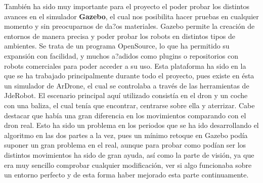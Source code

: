 \hspace{1 cm} Tambi\'en ha sido muy importante para el proyecto el poder probar los distintos avances en el simulador \textbf{Gazebo}, el cual nos posibilita hacer pruebas en cualquier momento y sin preocuparnos de da?os materiales. Gazebo permite la creaci\'on de entornos de manera precisa y poder probar los robots en distintos tipos de ambientes. Se trata de un programa OpenSource, lo que ha permitido su expansi\'on con facilidad, y muchos a?adidos como plugins o repositorios con robots comerciales para poder acceder a su uso. Esta plataforma ha sido en la que se ha trabajado principalmente durante todo el proyecto, pues existe en \'esta un simulador de ArDrone, el cual se controlaba a trav\'es de las herramientas de JdeRobot. El escenario principal aqu\'i utilizado consist\'ia en el dron y un coche con una baliza, el cual ten\'ia que encontrar, centrarse sobre ella y aterrizar. Cabe destacar que hab\'ia una gran diferencia en los movimientos comparando con el dron real. Esto ha sido un problema en los periodos que se ha ido desarrollando el algoritmo en las dos partes a la vez, pues un m\'inimo retoque en Gazebo pod\'ia suponer un gran problema en el real, aunque para probar como pod\'ian ser los distintos movimientos ha sido de gran ayuda, as\'i como la parte de visi\'on, ya que era muy sencillo comprobar cualquier modificaci\'on, ver si algo funcionaba sobre un entorno perfecto y de esta forma haber mejorado esta parte continuamente.

